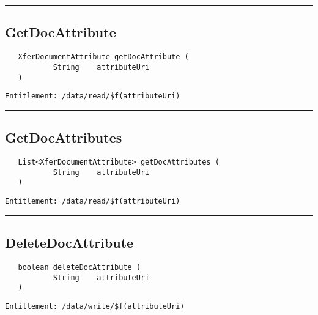 \rule{12cm}{2pt}
\subsection{GetDocAttribute}
\label{Api:GetDocAttribute}
\begin{Verbatim}
   XferDocumentAttribute getDocAttribute (
           String    attributeUri
   )
\end{Verbatim}
\begin{Verbatim}[formatcom=\color{Maroon}]
  Entitlement: /data/read/$f(attributeUri)
\end{Verbatim}



\rule{12cm}{2pt}
\subsection{GetDocAttributes}
\label{Api:GetDocAttributes}
\begin{Verbatim}
   List<XferDocumentAttribute> getDocAttributes (
           String    attributeUri
   )
\end{Verbatim}
\begin{Verbatim}[formatcom=\color{Maroon}]
  Entitlement: /data/read/$f(attributeUri)
\end{Verbatim}



\rule{12cm}{2pt}
\subsection{DeleteDocAttribute}
\label{Api:DeleteDocAttribute}
\begin{Verbatim}
   boolean deleteDocAttribute (
           String    attributeUri
   )
\end{Verbatim}
\begin{Verbatim}[formatcom=\color{Maroon}]
  Entitlement: /data/write/$f(attributeUri)
\end{Verbatim}



